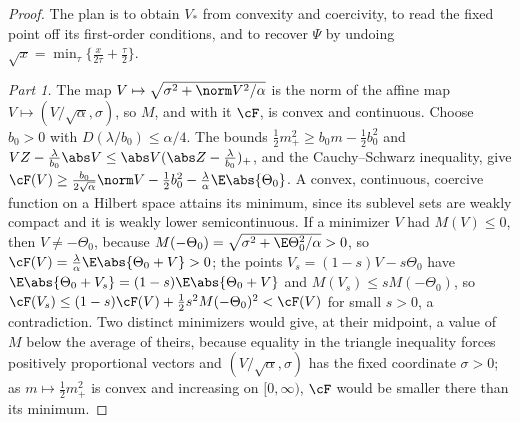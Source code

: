 \begin{refsection}
\begin{proof}
The plan is to obtain $V_*$ from convexity and coercivity, to read the fixed point off its first-order conditions, and to recover $\Psi$ by undoing $\sqrt x=\min_\tau\{\frac x{2\tau}+\frac\tau2\}$.

\emph{Part 1.} The map $V\mapsto\sqrt{\sigma^2+\norm V^2/\alpha}$ is the norm of the affine map $V\mapsto(V/\sqrt\alpha,\sigma)$, so $M$, and with it $\cF$, is convex and continuous. Choose $b_0>0$ with $D(\lambda/b_0)\le\alpha/4$. The bounds $\frac12m_+^2\ge b_0m-\frac12b_0^2$ and $VZ-\frac\lambda{b_0}\abs V\le\abs V(\abs Z-\frac\lambda{b_0})_+$, and the Cauchy--Schwarz inequality, give $\cF(V)\ge\frac{b_0}{2\sqrt\alpha}\norm V-\frac12b_0^2-\frac\lambda\alpha\E\abs{\Theta_0}$. A convex, continuous, coercive function on a Hilbert space attains its minimum, since its sublevel sets are weakly compact and it is weakly lower semicontinuous. If a minimizer $V$ had $M(V)\le0$, then $V\ne-\Theta_0$, because $M(-\Theta_0)=\sqrt{\sigma^2+\E\Theta_0^2/\alpha}>0$, so $\cF(V)=\frac\lambda\alpha\E\abs{\Theta_0+V}>0$; the points $V_s=(1-s)V-s\Theta_0$ have $\E\abs{\Theta_0+V_s}=(1-s)\E\abs{\Theta_0+V}$ and $M(V_s)\le sM(-\Theta_0)$, so $\cF(V_s)\le(1-s)\cF(V)+\frac12s^2M(-\Theta_0)^2<\cF(V)$ for small $s>0$, a contradiction. Two distinct minimizers would give, at their midpoint, a value of $M$ below the average of theirs, because equality in the triangle inequality forces positively proportional vectors and $(V/\sqrt\alpha,\sigma)$ has the fixed coordinate $\sigma>0$; as $m\mapsto\frac12m_+^2$ is convex and increasing on $[0,\infty)$, $\cF$ would be smaller there than its minimum.


\end{proof}
\end{refsection}
